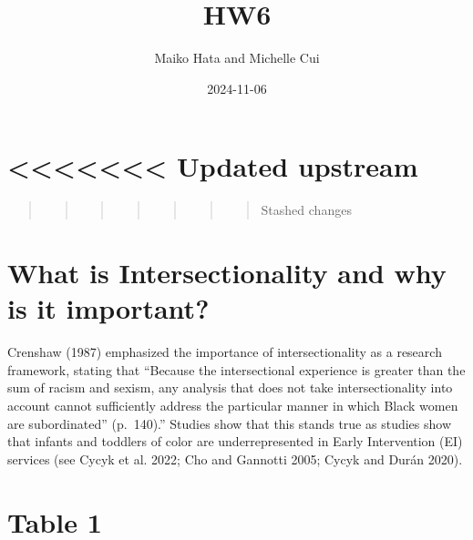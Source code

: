\documentclass[
  letterpaper,
  DIV=11,
  numbers=noendperiod]{scrartcl}
\title{HW6}
\author{Maiko Hata and Michelle Cui}
\date{2024-11-06}
\begin{document}
\maketitle


\section{\textless\textless\textless\textless\textless\textless\textless{}
Updated upstream}\label{updated-upstream}

\begin{quote}
\begin{quote}
\begin{quote}
\begin{quote}
\begin{quote}
\begin{quote}
\begin{quote}
Stashed changes
\end{quote}
\end{quote}
\end{quote}
\end{quote}
\end{quote}
\end{quote}
\end{quote}

\section{What is Intersectionality and why is it
important?}\label{what-is-intersectionality-and-why-is-it-important}

Crenshaw (1987) emphasized the importance of intersectionality as a
research framework, stating that ``Because the intersectional experience
is greater than the sum of racism and sexism, any analysis that does not
take intersectionality into account cannot sufficiently address the
particular manner in which Black women are subordinated'' (p.~140).''
Studies show that this stands true as studies show that infants and
toddlers of color are underrepresented in Early Intervention (EI)
services (see Cycyk et al. 2022; Cho and Gannotti 2005; Cycyk and Durán
2020).

\section{Table 1}\label{table-1}
\end{document}
